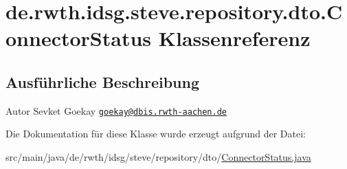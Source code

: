 \hypertarget{classde_1_1rwth_1_1idsg_1_1steve_1_1repository_1_1dto_1_1_connector_status}{\section{de.\+rwth.\+idsg.\+steve.\+repository.\+dto.\+Connector\+Status Klassenreferenz}
\label{classde_1_1rwth_1_1idsg_1_1steve_1_1repository_1_1dto_1_1_connector_status}
}


\subsection{Ausführliche Beschreibung}
\begin{DoxyAuthor}{Autor}
Sevket Goekay \href{mailto:goekay@dbis.rwth-aachen.de}{\tt goekay@dbis.\+rwth-\/aachen.\+de} 
\end{DoxyAuthor}


Die Dokumentation für diese Klasse wurde erzeugt aufgrund der Datei\+:\begin{DoxyCompactItemize}
\item 
src/main/java/de/rwth/idsg/steve/repository/dto/\hyperlink{_connector_status_8java}{Connector\+Status.\+java}\end{DoxyCompactItemize}
